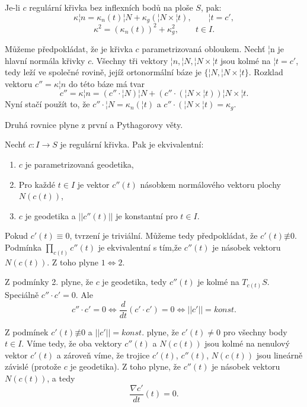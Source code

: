 \documentclass[12pt]{article}                   %
\begin{document}
        \begin{veta}
            Je-li $c$ regulární křivka bez inflexních bodů na ploše $S$, pak:
            $$ \kappa ¦n = \kappa_n(t)¦N + \kappa_g(¦N \times ¦t), \qquad ¦t = c', $$
            $$ \kappa^2 = (\kappa_n(t))^2 + \kappa_g^2, \qquad t \in I. $$

            \begin{dukazin}
                Můžeme předpokládat, že je křivka $c$ parametrizovaná obloukem. Nechť ¦n je hlavní normála křivky $c$. Všechny tři vektory $¦n, ¦N , ¦N \times ¦t$ jsou kolmé na $¦t = c'$, tedy leží ve společné rovině, jejíž ortonormální báze je $\{¦N, ¦N \times ¦t\}$. Rozklad vektoru $c'' = \kappa¦n$ do této báze má tvar
                $$ c'' = \kappa¦n = (c''·¦N)¦N + (c''·(¦N \times ¦t))¦N \times ¦t. $$
                Nyní stačí použít to, že $c''·¦N = \kappa_n(¦t)$ a $c''·(¦N \times ¦t) = \kappa_g$.

                Druhá rovnice plyne z první a Pythagorovy věty.
            \end{dukazin}
        \end{veta}

        \begin{lemma}
            Nechť $c: I \rightarrow S$ je regulární křivka. Pak je ekvivalentní:
            
            \begin{enumerate}
                \item $c$ je parametrizovaná geodetika,
                \item Pro každé $t \in I$ je vektor $c''(t)$ násobkem normálového vektoru plochy $N(c(t))$,
                \item $c$ je geodetika a $||c''(t)||$ je konstantní pro $t \in I$.
            \end{enumerate}

            \begin{dukazin}
                Pokud $c'(t) ≡ 0$, tvrzení je triviální. Můžeme tedy předpokládat, že $c'(t) \not≡ 0$. Podmínka $\prod_{c(t)}c''(t)$ je ekvivalentní s tím,že $c''(t)$ je násobek vektoru $N(c(t))$. Z toho plyne $1 \Leftrightarrow 2$.

                Z podmínky 2. plyne, že $c$ je geodetika, tedy $c''(t)$ je kolmé na $T_{c(t)}S$. Speciálně $c''·c' = 0$. Ale
                $$ c''·c' = 0 \Leftrightarrow \frac{d}{dt}(c'·c') = 0 \Leftrightarrow ||c'|| = konst. $$

                Z podmínek $c'(t) \not≡0$ a $||c'|| = konst.$ plyne, že $c'(t) ≠ 0$ pro všechny body $t \in I$. Víme tedy, že oba vektory $c''(t)$ a $N(c(t))$ jsou kolmé na nenulový vektor $c'(t)$ a zároveň víme, že trojice $c'(t)$, $c''(t)$, $N(c(t))$ jsou lineárně závislé (protože $c$ je geodetika). Z toho plyne, že $c''(t)$ je násobek vektoru $N(c(t))$, a tedy
                $$ \frac{\nabla c'}{dt}(t) = 0. $$
            \end{dukazin}
        \end{lemma}
\end{document}
